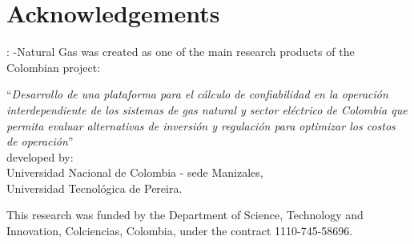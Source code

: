 \chapter{Acknowledgements}
\label{chap:ack}

\mpng{}: \matpower{}-Natural Gas was created as one of the main research products of the Colombian project:\\

\begin{center}
``\textit{Desarrollo de una plataforma para el cálculo de confiabilidad en la operación interdependiente de los sistemas de gas natural y sector eléctrico de Colombia que permita evaluar alternativas de inversión y regulación para optimizar los costos de operación}''\\
 
\vspace{1cm} 
developed by:\\

\vspace{1cm}
Universidad Nacional de Colombia - sede Manizales,\\
Universidad Tecnológica de Pereira.
\end{center} 

\vspace{1cm}
\noindent This research was funded by the Department of Science, Technology and Innovation, Colciencias, Colombia, under the contract 1110-745-58696. 




